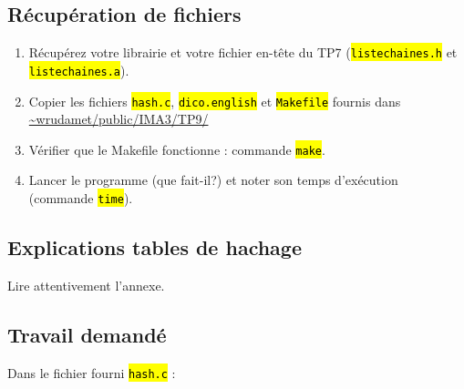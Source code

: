 \documentclass[final, pdftex, a4paper, openbib, ]{article}
\let\OldTexttt\texttt
\renewcommand{\texttt}[1]{\OldTexttt{\hl{#1}}}
\begin{document}
\subsection{Récupération de fichiers}

\begin{enumerate}
	\item Récupérez votre librairie et votre fichier en-tête du TP7 (\texttt{listechaines.h} et \texttt{listechaines.a}).
	\item Copier les fichiers \texttt{hash.c}, \texttt{dico.english} et \texttt{Makefile} fournis dans \url{~wrudamet/public/IMA3/TP9/}
	\item Vérifier que le Makefile fonctionne : commande \texttt{make}.
	\item Lancer le programme (que fait-il?) et noter son temps d'exécution (commande \texttt{time}).
\end{enumerate}	


\subsection{Explications tables de hachage}
Lire attentivement l'annexe.


\subsection{Travail demandé}
	Dans le fichier fourni \texttt{hash.c} :
\end{document}

